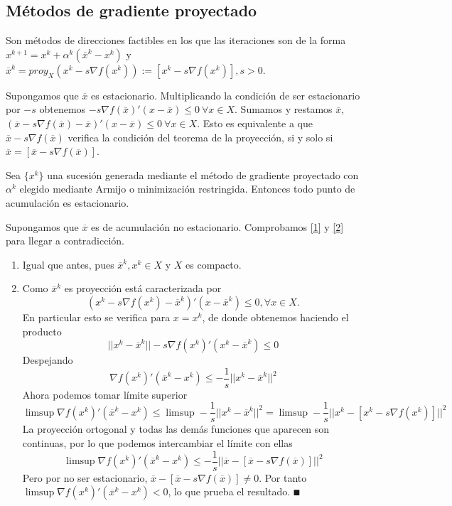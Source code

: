 \documentclass[MIOP.tex]{subfiles}
\begin{document}
\subsection{Métodos de gradiente proyectado}
Son métodos de direcciones factibles en los que las iteraciones son de la forma $x^{k+1}=x^k+\alpha^k(\overline{x}^k-x^k)$ y $\overline{x}^k=proy_X(x^k-s\nabla f(x^k)):=[x^k-s\nabla f(x^k)], s>0$. 

Supongamos que $\overline{x}$ es estacionario. Multiplicando la condición de ser estacionario por $-s$ obtenemos $-s\nabla f(\overline{x})'(x-\overline{x})\leq 0\ \forall x\in X$. Sumamos y restamos $\overline{x}$, $(\overline{x}-s\nabla f(\overline{x})-\overline{x})'(x-\overline{x})\leq 0\ \forall x\in X$. Esto es equivalente a que $\overline{x}-s\nabla f(\overline{x})$ verifica la condición del teorema de la proyección, si y solo si $\overline{x}=[\overline{x}-s\nabla f(\overline{x})]$. 

\begin{teorema}
Sea $\{x^k\}$ una sucesión generada mediante el método de gradiente proyectado con $\alpha^k$ elegido mediante Armijo o minimización restringida. Entonces todo punto de acumulación es estacionario.
\end{teorema}
\begin{dem}
Supongamos que $\overline{x}$ es de acumulación no estacionario. Comprobamos \ref{1} y \ref{2} para llegar a contradicción.
\begin{enumerate}
\item Igual que antes, pues $\overline{x}^k, x^k\in X$ y $X$ es compacto.
\item Como $\overline{x}^k$ es proyección está caracterizada por 
$$(x^k-s\nabla f(x^k)-\overline{x}^k)'(x-\overline{x}^k)\leq 0, \forall x\in X.$$
En particular esto se verifica para $x=x^k$, de donde obtenemos haciendo el producto
$$||x^k-\overline{x}^k||-s\nabla f(x^k)'(x^k-\overline{x}^k)\leq 0$$
Despejando
$$\nabla f(x^k)'(\overline{x}^k-x^k)\leq -\frac{1}{s}||x^k-\overline{x}^k||^2$$
Ahora podemos tomar límite superior
$$\limsup \nabla f(x^k)'(\overline{x}^k-x^k)\leq \limsup-\frac{1}{s}||x^k-\overline{x}^k||^2=\limsup-\frac{1}{s}||x^k-[x^k-s\nabla f(x^k)]||^2$$
La proyección ortogonal y todas las demás funciones que aparecen son continuas, por lo que podemos intercambiar el límite con ellas
$$\limsup \nabla f(x^k)'(\overline{x}^k-x^k)\leq -\frac{1}{s}||\overline{x}-[\overline{x}-s\nabla f(\overline{x})]||^2$$
Pero por no ser estacionario, $\overline{x}-[\overline{x}-s\nabla f(\overline{x})]\neq 0$. Por tanto $\limsup \nabla f(x^k)'(\overline{x}^k-x^k)<0$, lo que prueba el resultado. $\QED$
\end{enumerate}
\end{dem}
\end{document}
